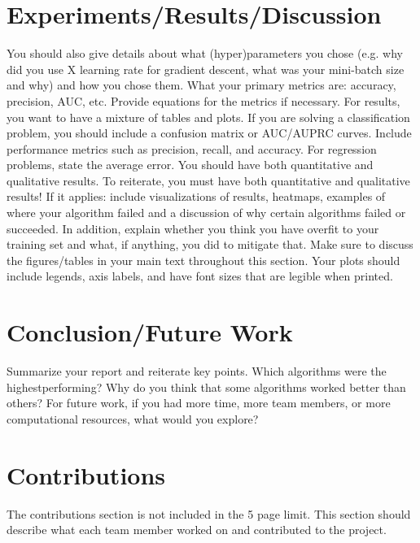\documentclass{article}
\begin{document}
\section{Experiments/Results/Discussion}

You should also give details about what (hyper)parameters you chose (e.g. why did you
use X learning rate for gradient descent, what was your mini-batch size and why) and how
you chose them. What your primary metrics are: accuracy, precision,
AUC, etc. Provide equations for the metrics if necessary. For results, you want to have a
mixture of tables and plots. If you are solving a classification problem, you should include a
confusion matrix or AUC/AUPRC curves. Include performance metrics such as precision,
recall, and accuracy. For regression problems, state the average error. You should have
both quantitative and qualitative results. To reiterate, you must have both quantitative
and qualitative results! If it applies: include visualizations of results, heatmaps,
examples of where your algorithm failed and a discussion of why certain algorithms failed
or succeeded. In addition, explain whether you think you have overfit to your training set
and what, if anything, you did to mitigate that. Make sure to discuss the figures/tables in
your main text throughout this section. Your plots should include legends, axis labels, and
have font sizes that are legible when printed.

\section{Conclusion/Future Work }
Summarize your report and reiterate key points. Which algorithms were the highestperforming?
Why do you think that some algorithms worked better than others? For
future work, if you had more time, more team members, or more computational resources,
what would you explore?

\section{Contributions}
The contributions section is not included in the 5 page limit. This section should describe
what each team member worked on and contributed to the project.

\medskip
\small



\end{document}
